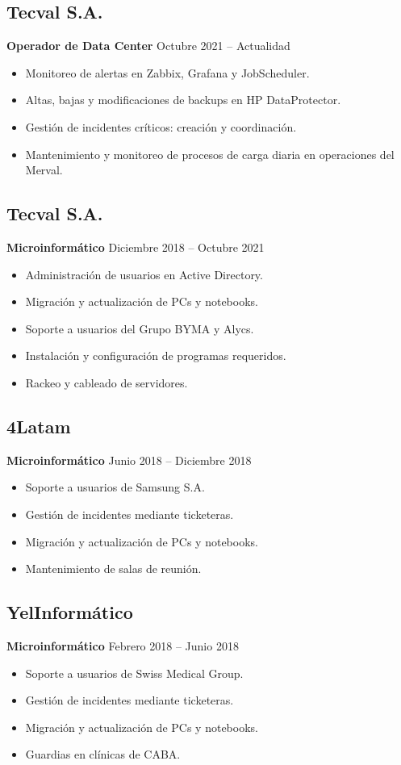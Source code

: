 \documentclass[a4paper,10pt]{article}
\begin{document}
\subsection*{\Large\textbf{Tecval S.A.}}
\textbf{\normalsize Operador de Data Center} \hfill Octubre 2021 – Actualidad
\begin{itemize}
    \item Monitoreo de alertas en Zabbix, Grafana y JobScheduler.
    \item Altas, bajas y modificaciones de backups en HP DataProtector.
    \item Gestión de incidentes críticos: creación y coordinación.
    \item Mantenimiento y monitoreo de procesos de carga diaria en operaciones del Merval.
\end{itemize}

\subsection*{\Large\textbf{Tecval S.A.}}
\textbf{\normalsize Microinformático} \hfill Diciembre 2018 – Octubre 2021
\begin{itemize}
    \item Administración de usuarios en Active Directory.
    \item Migración y actualización de PCs y notebooks.
    \item Soporte a usuarios del Grupo BYMA y Alycs.
    \item Instalación y configuración de programas requeridos.
    \item Rackeo y cableado de servidores.
\end{itemize}

\subsection*{\Large\textbf{4Latam}}
\textbf{\normalsize Microinformático} \hfill Junio 2018 – Diciembre 2018
\begin{itemize}
    \item Soporte a usuarios de Samsung S.A.
    \item Gestión de incidentes mediante ticketeras.
    \item Migración y actualización de PCs y notebooks.
    \item Mantenimiento de salas de reunión.
\end{itemize}

\subsection*{\Large\textbf{YelInformático}}
\textbf{\normalsize Microinformático} \hfill Febrero 2018 – Junio 2018
\begin{itemize}
    \item Soporte a usuarios de Swiss Medical Group.
    \item Gestión de incidentes mediante ticketeras.
    \item Migración y actualización de PCs y notebooks.
    \item Guardias en clínicas de CABA.
\end{itemize}
\end{document}
